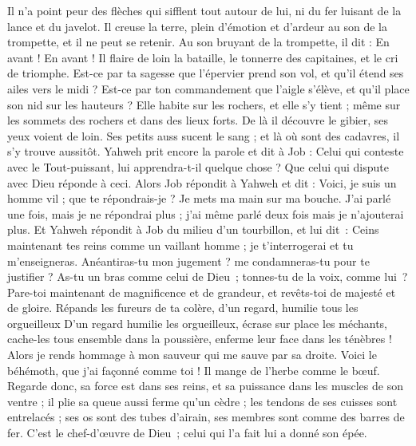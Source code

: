 \begin{multicols}{2}
Il n'a point peur des flèches qui sifflent tout autour de lui, ni du fer luisant de la lance et du javelot. 
Il creuse la terre, plein d'émotion et d'ardeur au son de la trompette, et il ne peut se retenir. 
Au son bruyant de la trompette, il dit : En avant ! En avant ! Il flaire de loin la bataille, le tonnerre des capitaines, et le cri de triomphe.
Est-ce par ta sagesse que l'épervier prend son vol, et qu'il étend ses ailes vers le midi ?
Est-ce par ton commandement que l'aigle s'élève, et qu'il place son nid sur les hauteurs ?
Elle habite sur les rochers, et elle s'y tient ; même sur les sommets des rochers et dans des lieux forts. 
De là il découvre le gibier, ses yeux voient de loin.
Ses petits auss sucent le sang ; et là où sont des cadavres, il s'y trouve aussitôt.
Yahweh prit encore la parole et dit à Job :
Celui qui conteste avec le Tout-puissant, lui apprendra-t-il quelque chose ? Que celui qui dispute avec Dieu réponde à ceci.
Alors Job répondit à Yahweh et dit :
Voici, je suis un homme vil ; que te répondrais-je ? Je mets ma main sur ma bouche.
J'ai parlé une fois, mais je ne répondrai plus ; j'ai même parlé deux fois mais je n'ajouterai plus.
\VerseOne{}Et Yahweh répondit à Job du milieu d'un tourbillon, et lui dit :
Ceins maintenant tes reins comme un vaillant homme ; je t'interrogerai et tu m'enseigneras.
Anéantiras-tu mon jugement ? me condamneras-tu pour te justifier ?
As-tu un bras comme celui de Dieu ; tonnes-tu de la voix, comme lui ?
Pare-toi maintenant de magnificence et de grandeur, et revêts-toi de majesté et de gloire.
Répands les fureurs de ta colère, d'un regard, humilie tous les orgueilleux
D'un regard humilie les orgueilleux, écrase sur place les méchants,
cache-les tous ensemble dans la poussière, enferme leur face dans les ténèbres !
Alors je rends hommage à mon sauveur qui me sauve par sa droite.
Voici le béhémoth, que j'ai façonné comme toi ! Il mange de l'herbe comme le bœuf.
Regarde donc, sa force est dans ses reins, et sa puissance dans les muscles de son ventre ;
il plie sa queue aussi ferme qu'un cèdre ; les tendons de ses cuisses sont entrelacés ;
ses os sont des tubes d'airain, ses membres sont comme des barres de fer.
C’est le chef-d’œuvre de Dieu ; celui qui l’a fait lui a donné son épée.

\end{multicols}
